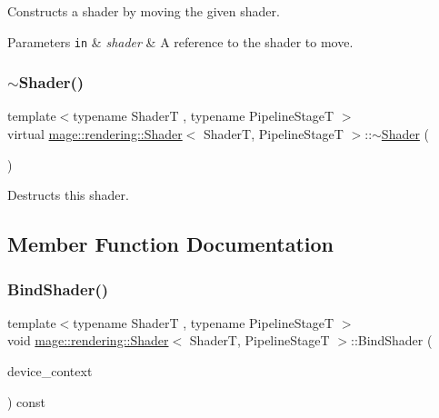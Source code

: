 Constructs a shader by moving the given shader.


\begin{DoxyParams}[1]{Parameters}
\mbox{\tt in}  & {\em shader} & A reference to the shader to move. \\
\hline
\end{DoxyParams}
\mbox{\label{classmage_1_1rendering_1_1_shader_af9774a6a1f073f0477c5f4e35f130181}} 
\subsubsection{\texorpdfstring{$\sim$\+Shader()}{~Shader()}}
{\footnotesize\ttfamily template$<$typename ShaderT , typename Pipeline\+StageT $>$ \\
virtual \mbox{\hyperlink{classmage_1_1rendering_1_1_shader}{mage\+::rendering\+::\+Shader}}$<$ ShaderT, Pipeline\+StageT $>$\+::$\sim$\mbox{\hyperlink{classmage_1_1rendering_1_1_shader}{Shader}} (\begin{DoxyParamCaption}{ }\end{DoxyParamCaption})\hspace{0.3cm}{\ttfamily [virtual]}}

Destructs this shader. 

\subsection{Member Function Documentation}
\mbox{\label{classmage_1_1rendering_1_1_shader_abb37464c991b9b49e94c93968e884f13}} 
\subsubsection{\texorpdfstring{Bind\+Shader()}{BindShader()}}
{\footnotesize\ttfamily template$<$typename ShaderT , typename Pipeline\+StageT $>$ \\
void \mbox{\hyperlink{classmage_1_1rendering_1_1_shader}{mage\+::rendering\+::\+Shader}}$<$ ShaderT, Pipeline\+StageT $>$\+::Bind\+Shader (\begin{DoxyParamCaption}\item[{I\+D3\+D11\+Device\+Context \&}]{device\+\_\+context }\end{DoxyParamCaption}) const\hspace{0.3cm}{\ttfamily [noexcept]}}

